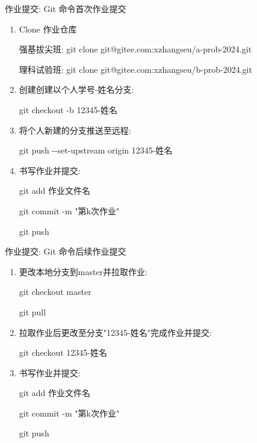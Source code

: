 \begin{frame}[fragile]{作业提交: Git 命令首次作业提交}

\begin{enumerate}[<+-|alert@+>]
	\item Clone 作业仓库

			强基拔尖班: git clone git@gitee.com:xzhangseu/a-prob-2024.git

			理科试验班: git clone git@gitee.com:xzhangseu/b-prob-2024.git

	\item 创建创建以个人学号-姓名分支:

			git checkout -b 12345-姓名

	\item 将个人新建的分支推送至远程:

			git push {-}{-}set-upstream origin 12345-姓名

	\item 书写作业并提交:

	      git add 作业文件名

		  git commit -m "第k次作业"

		  git push


\end{enumerate}


\end{frame}





\begin{frame}[fragile]{作业提交: Git 命令后续作业提交}

	\begin{enumerate}[<+-|alert@+>]
		\item 更改本地分支到master并拉取作业:

				git checkout master

				git pull

		\item 拉取作业后更改至分支"12345-姓名"完成作业并提交:

				git checkout 12345-姓名

		\item 书写作业并提交:

			  git add 作业文件名

			  git commit -m "第k次作业"

			  git push



	\end{enumerate}
\end{frame}


